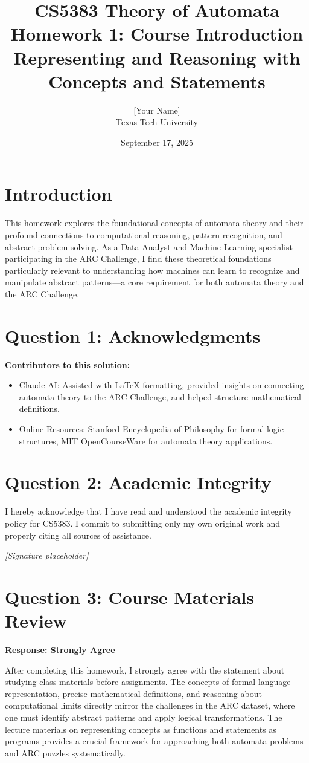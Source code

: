 \documentclass[12pt]{article}
\title{CS5383 Theory of Automata\\
Homework 1: Course Introduction\\
Representing and Reasoning with Concepts and Statements}
\author{[Your Name]\\
Texas Tech University}
\date{September 17, 2025}
\theoremstyle{definition}
\begin{document}
\maketitle

\section*{Introduction}
This homework explores the foundational concepts of automata theory and their profound connections to computational reasoning, pattern recognition, and abstract problem-solving. As a Data Analyst and Machine Learning specialist participating in the ARC Challenge, I find these theoretical foundations particularly relevant to understanding how machines can learn to recognize and manipulate abstract patterns—a core requirement for both automata theory and the ARC Challenge.

\section*{Question 1: Acknowledgments}
\textbf{Contributors to this solution:}
\begin{itemize}
    \item Claude AI: Assisted with LaTeX formatting, provided insights on connecting automata theory to the ARC Challenge, and helped structure mathematical definitions.
    \item Online Resources: Stanford Encyclopedia of Philosophy for formal logic structures, MIT OpenCourseWare for automata theory applications.
\end{itemize}

\section*{Question 2: Academic Integrity}
I hereby acknowledge that I have read and understood the academic integrity policy for CS5383. I commit to submitting only my own original work and properly citing all sources of assistance.

\textit{[Signature placeholder]}

\section*{Question 3: Course Materials Review}
\textbf{Response: Strongly Agree}

After completing this homework, I strongly agree with the statement about studying class materials before assignments. The concepts of formal language representation, precise mathematical definitions, and reasoning about computational limits directly mirror the challenges in the ARC dataset, where one must identify abstract patterns and apply logical transformations. The lecture materials on representing concepts as functions and statements as programs provides a crucial framework for approaching both automata problems and ARC puzzles systematically.
\end{document}
